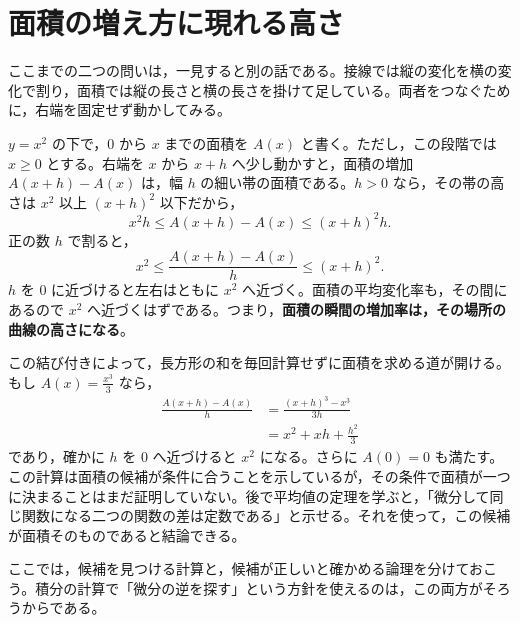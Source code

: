 \section{面積の増え方に現れる高さ}\label{節:導入基本定理}
ここまでの二つの問いは，一見すると別の話である。接線では縦の変化を横の変化で割り，面積では縦の長さと横の長さを掛けて足している。両者をつなぐために，右端を固定せず動かしてみる。

$y=x^2$ の下で，$0$ から $x$ までの面積を $A(x)$ と書く。ただし，この段階では $x\ge0$ とする。右端を $x$ から $x+h$ へ少し動かすと，面積の増加 $A(x+h)-A(x)$ は，幅 $h$ の細い帯の面積である。$h>0$ なら，その帯の高さは $x^2$ 以上 $(x+h)^2$ 以下だから，
\[
 x^2h\le A(x+h)-A(x)\le(x+h)^2h.
\]
正の数 $h$ で割ると，
\[
 x^2\le\frac{A(x+h)-A(x)}h\le(x+h)^2.
\]
$h$ を $0$ に近づけると左右はともに $x^2$ へ近づく。面積の平均変化率も，その間にあるので $x^2$ へ近づくはずである。つまり，\textbf{面積の瞬間の増加率は，その場所の曲線の高さになる}。

この結び付きによって，長方形の和を毎回計算せずに面積を求める道が開ける。もし $A(x)=\frac{x^3}{3}$ なら，
\begin{align*}
 \frac{A(x+h)-A(x)}h
 &=\frac{(x+h)^3-x^3}{3h}\\
 &=x^2+xh+\frac{h^2}{3}
\end{align*}
であり，確かに $h$ を $0$ へ近づけると $x^2$ になる。さらに $A(0)=0$ も満たす。この計算は面積の候補が条件に合うことを示しているが，その条件で面積が一つに決まることはまだ証明していない。後で平均値の定理を学ぶと，「微分して同じ関数になる二つの関数の差は定数である」と示せる。それを使って，この候補が面積そのものであると結論できる。

ここでは，候補を見つける計算と，候補が正しいと確かめる論理を分けておこう。積分の計算で「微分の逆を探す」という方針を使えるのは，この両方がそろうからである。

